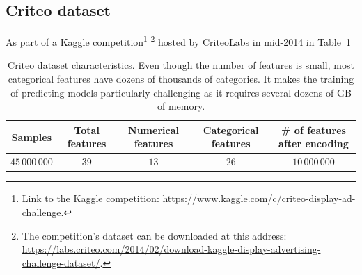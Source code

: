 \subsection{Criteo dataset}\label{subsec:snb_criteo}

As part of a Kaggle competition\footnote{
        Link to the Kaggle competition: \url{https://www.kaggle.com/c/criteo-display-ad-challenge}.
}
\footnote{
        The competition's dataset can be downloaded at this address:
        \url{https://labs.criteo.com/2014/02/download-kaggle-display-advertising-challenge-dataset/}.
}
hosted by CriteoLabs in mid-2014
in Table~\ref{tab:criteo_dataset}
\begin{table}[]
        \centering
        \setlength{\tabcolsep}{2pt}
        {\small
        \begin{tabular}{|c|c|c|c|c|}\hline
        \textbf{Samples} & \textbf{Total features} & \textbf{Numerical features} & \textbf{Categorical features} & \textbf{\# of features after encoding}\\ \hline
        $45\,000\,000$ & $39$  & $13$ & $26$ & $10\,000\,000$ \\ \hline
        \end{tabular}
        }%
        \caption[short]{
                Criteo dataset characteristics.
                Even though the number of features is small,
                most categorical features have dozens of thousands of categories.
                It makes the training of predicting models particularly challenging as it requires several
                dozens of GB of memory.
        }
        \label{tab:criteo_dataset}
\end{table}